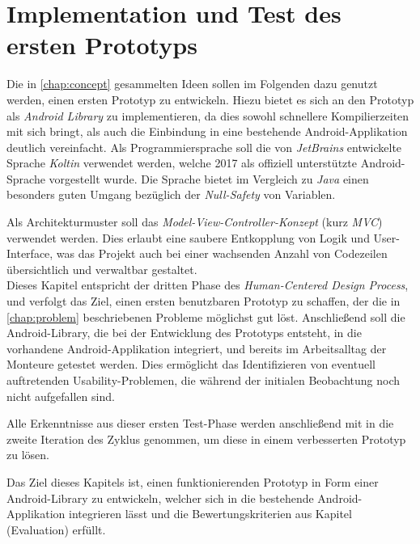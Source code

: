 \chapter{Implementation und Test des ersten Prototyps}

Die in \autoref{chap:concept} gesammelten Ideen sollen im Folgenden dazu genutzt werden, einen ersten Prototyp zu entwickeln.
Hiezu bietet es sich an den Prototyp als \emph{Android Library}  zu implementieren, da dies sowohl schnellere Kompilierzeiten mit sich bringt, als auch die Einbindung in eine bestehende Android-Applikation deutlich vereinfacht.
Als Programmiersprache soll die von \emph{JetBrains} entwickelte Sprache \emph{Koltin} verwendet werden, welche 2017 als offiziell unterstützte Android-Sprache vorgestellt wurde.
Die Sprache bietet im Vergleich zu \emph{Java} einen besonders guten Umgang bezüglich der \emph{Null-Safety} von Variablen. \\

Als Architekturmuster soll das \emph{Model-View-Controller-Konzept} (kurz \emph{MVC}) verwendet werden. 
Dies erlaubt eine saubere Entkopplung von Logik und User-Interface, was das Projekt auch bei einer wachsenden Anzahl von Codezeilen übersichtlich und verwaltbar gestaltet. \\

Dieses Kapitel entspricht der dritten Phase des \emph{Human-Centered Design Process}, und verfolgt das Ziel, einen ersten benutzbaren Prototyp zu schaffen, der die in \autoref{chap:problem} beschriebenen Probleme möglichst gut löst. Anschließend soll die Android-Library, die bei der Entwicklung des Prototyps entsteht, in die vorhandene Android-Applikation integriert, und bereits im Arbeitsalltag der Monteure getestet werden.
Dies ermöglicht das Identifizieren von eventuell auftretenden Usability-Problemen, die während der initialen Beobachtung noch nicht aufgefallen sind.

Alle Erkenntnisse aus dieser ersten Test-Phase werden anschließend mit in die zweite Iteration des Zyklus genommen, um diese in einem verbesserten Prototyp zu lösen.

Das Ziel dieses Kapitels ist, einen funktionierenden Prototyp in Form einer Android-Library zu entwickeln, welcher sich in die bestehende Android-Applikation integrieren lässt und die Bewertungskriterien aus Kapitel (Evaluation) erfüllt.





